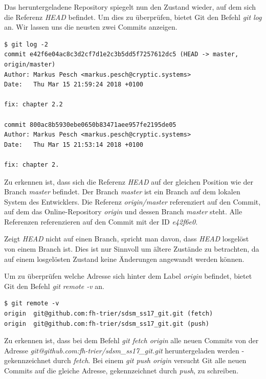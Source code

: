 Das heruntergeladene Repository spiegelt nun den Zustand wieder, auf dem sich die Referenz \textit{HEAD} befindet. Um dies zu überprüfen, bietet Git den Befehl \textit{git log} an. Wir lassen uns die neusten zwei Commits anzeigen.

\begin{verbatim}
$ git log -2
commit e42f6e04ac8c3d2cf7d1e2c3b5dd5f7257612dc5 (HEAD -> master, origin/master)
Author: Markus Pesch <markus.pesch@cryptic.systems>
Date:   Thu Mar 15 21:59:24 2018 +0100

fix: chapter 2.2

commit 800ac8b5930ebe0650b83471aee957fe2195de05
Author: Markus Pesch <markus.pesch@cryptic.systems>
Date:   Thu Mar 15 21:53:14 2018 +0100

fix: chapter 2.
\end{verbatim}

Zu erkennen ist, dass sich die Referenz \textit{HEAD} auf der gleichen Position wie der Branch \textit{master} befindet. Der Branch \textit{master} ist ein Branch auf dem lokalen System des Entwicklers. Die Referenz \textit{origin/master} referenziert auf den Commit, auf dem das Online-Repository \textit{origin} und dessen Branch \textit{master} steht. Alle Referenzen referenzieren auf den Commit mit der ID \textit{e42f6e0}.

\begin{WARN}
  Zeigt \textit{HEAD} nicht auf einen Branch, spricht man davon, dass \textit{HEAD} losgelöst von einem Branch ist. Dies ist nur Sinnvoll um ältere Zustände zu betrachten, da auf einem losgelösten Zustand keine Änderungen angewandt werden können.
\end{WARN}

Um zu überprüfen welche Adresse sich hinter dem Label \textit{origin} befindet, bietet Git den Befehl \textit{git remote -v} an.

\begin{verbatim}
$ git remote -v
origin  git@github.com:fh-trier/sdsm_ss17_git.git (fetch)
origin  git@github.com:fh-trier/sdsm_ss17_git.git (push)
\end{verbatim}

Zu erkennen ist, dass bei dem Befehl \textit{git fetch origin} alle neuen Commits von der Adresse \textit{git@github.com:fh-trier/sdsm\_ss17\_git.git} heruntergeladen werden - gekennzeichnet durch \textit{fetch}. Bei einem \textit{git push origin} versucht Git alle neuen Commits auf die gleiche Adresse, gekennzeichnet durch \textit{push}, zu schreiben. 

